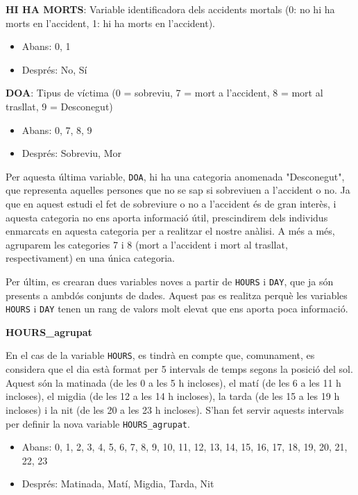 \documentclass[12pt,longbibliography]{article}
\theoremstyle{definition}
\theoremstyle{remark}
\begin{document}
\textbf{HI HA MORTS}: Variable identificadora dels accidents mortals (0: no hi ha morts en l'accident, 1: hi ha morts en l'accident).


\begin{itemize}

\item Abans: 0, 1

\item  Després: No, Sí

\end{itemize}

\textbf{DOA}: Tipus de víctima (0 = sobreviu, 7 = mort a l’accident, 8 = mort al trasllat, 9 = Desconegut)

\begin{itemize}

\item  Abans: 0, 7, 8, 9

\item  Després: Sobreviu, Mor

\end{itemize}

Per aquesta última variable, \texttt{DOA}, hi ha una categoria anomenada "Desconegut", que representa aquelles persones que no se sap si sobreviuen a l'accident o no. Ja que en aquest estudi el fet de sobreviure o no a l'accident és de gran interès, i aquesta categoria  no ens aporta informació útil, prescindirem dels individus enmarcats en aquesta categoria per a realitzar el nostre anàlisi. A més a més, agruparem les categories 7 i 8 (mort a l'accident i mort al trasllat, respectivament) en una única categoria.

Per últim, es crearan dues variables noves a partir de \texttt{HOURS} i \texttt{DAY}, que ja són presents a ambdós conjunts de dades. Aquest pas es realitza perquè les variables \texttt{HOURS} i \texttt{DAY} tenen un rang de valors molt elevat que ens aporta poca informació. 

\textbf{HOURS\_agrupat}

En el cas de la variable \texttt{HOURS}, es tindrà en compte que, comunament, es considera que el dia està format per 5 intervals de temps segons la posició del sol. Aquest són la matinada (de les 0 a les 5 h incloses), el matí (de les 6 a les 11 h incloses), el migdia (de les 12 a les 14 h incloses), la tarda (de les 15 a les 19 h incloses) i la nit (de les 20 a les 23 h incloses). S'han fet servir aquests intervals per definir la nova variable \texttt{HOURS\_agrupat}.

\begin{itemize}

\item Abans: 0, 1, 2, 3, 4, 5, 6, 7, 8, 9, 10, 11, 12, 13, 14, 15, 16, 17, 18, 19, 20, 21, 22, 23

\item Després: Matinada, Matí, Migdia, Tarda, Nit

\end{itemize}
\end{document}
